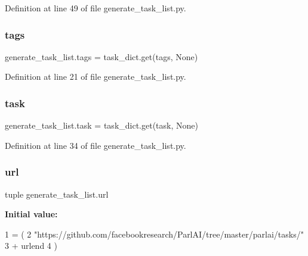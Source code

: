 Definition at line 49 of file generate\+\_\+task\+\_\+list.\+py.

\mbox{\label{namespacegenerate__task__list_ad95d77ecc0bed7196aa01e9576c8ecc1}} 
\subsubsection{\texorpdfstring{tags}{tags}}
{\footnotesize\ttfamily generate\+\_\+task\+\_\+list.\+tags = task\+\_\+dict.\+get(\textquotesingle{}tags\textquotesingle{}, None)}



Definition at line 21 of file generate\+\_\+task\+\_\+list.\+py.

\mbox{\label{namespacegenerate__task__list_a6a85e730374a68f9195f2e0e4fc09a9a}} 
\subsubsection{\texorpdfstring{task}{task}}
{\footnotesize\ttfamily generate\+\_\+task\+\_\+list.\+task = task\+\_\+dict.\+get(\textquotesingle{}task\textquotesingle{}, None)}



Definition at line 34 of file generate\+\_\+task\+\_\+list.\+py.

\mbox{\label{namespacegenerate__task__list_a44c805c529a26ee211795d8c7064facb}} 
\subsubsection{\texorpdfstring{url}{url}}
{\footnotesize\ttfamily tuple generate\+\_\+task\+\_\+list.\+url}

{\bfseries Initial value\+:}
\begin{DoxyCode}
1 =  (
2             \textcolor{stringliteral}{"https://github.com/facebookresearch/ParlAI/tree/master/parlai/tasks/"}
3             + urlend
4         )
\end{DoxyCode}


